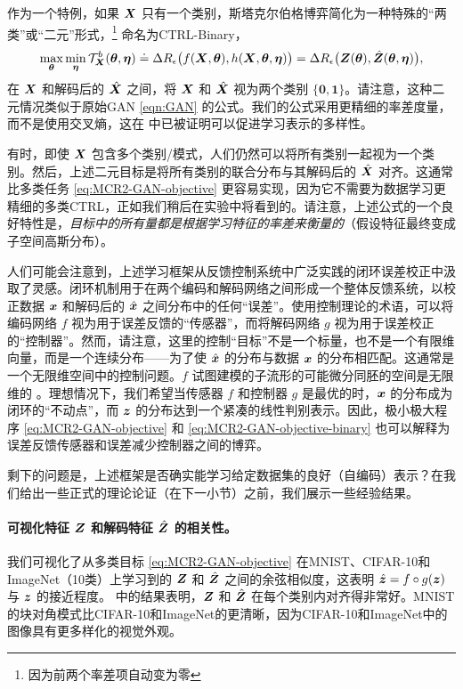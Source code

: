 \documentclass[../../book-main.tex]{subfiles}
\begin{document}
作为一个特例，如果 $\bm{X}$ 只有一个类别，斯塔克尔伯格博弈简化为一种特殊的“两类”或“二元”形式，\footnote{因为前两个率差项自动变为零} 命名为CTRL-Binary，
\begin{equation}
 \max_{\bm \theta} \min_{\bm \eta} \mathcal{T}^b_{\bm{X}}(\bm \theta, \bm \eta) \doteq \Delta R_\epsilon\big(f(\bm{X},\bm \theta), h(\bm{X},\bm \theta,\bm \eta)\big) = \Delta R_\epsilon\big(\bm{Z}(\bm \theta), \hat {\bm{Z}}(\bm \theta, \bm \eta)\big), 
    \label{eq:MCR2-GAN-objective-binary}
\end{equation}
在 $\bm{X}$ 和解码后的 $\hat{\bm{X}}$ 之间，将 $\bm{X}$ 和 $\hat {\bm{X}}$ 视为两个类别 $\{\bm 0, \bm 1\}$。请注意，这种二元情况类似于原始GAN \eqref{eqn:GAN} 的公式。我们的公式采用更精细的率差度量，而不是使用交叉熵，这在  中已被证明可以促进学习表示的多样性。

有时，即使 $\bm{X}$ 包含多个类别/模式，人们仍然可以将所有类别一起视为一个类别。然后，上述二元目标是将所有类别的联合分布与其解码后的 $\hat {\bm{X}}$ 对齐。这通常比多类任务 \eqref{eq:MCR2-GAN-objective} 更容易实现，因为它不需要为数据学习更精细的多类CTRL，正如我们稍后在实验中将看到的。请注意，上述公式的一个良好特性是，{\em 目标中的所有量都是根据学习特征的率差来衡量的}（假设特征最终变成子空间高斯分布）。

人们可能会注意到，上述学习框架从反馈控制系统中广泛实践的闭环误差校正中汲取了灵感。闭环机制用于在两个编码和解码网络之间形成一个整体反馈系统，以校正数据 $\bm{x}$ 和解码后的 $\hat {\bm{x}}$ 之间分布中的任何“误差”。使用控制理论的术语，可以将编码网络 $f$ 视为用于误差反馈的“传感器”，而将解码网络 $g$ 视为用于误差校正的“控制器”。然而，请注意，这里的控制“目标”不是一个标量，也不是一个有限维向量，而是一个连续分布——为了使 $\hat {\bm{x}}$ 的分布与数据 $\bm{x}$ 的分布相匹配。这通常是一个无限维空间中的控制问题。$f$ 试图建模的子流形的可能微分同胚的空间是无限维的 \cite{Lee2002IntroductionTS}。理想情况下，我们希望当传感器 $f$ 和控制器 $g$ 是最优的时，$\bm{x}$ 的分布成为闭环的“不动点”，而 $\bm{z}$ 的分布达到一个紧凑的线性判别表示。因此，极小极大程序 \eqref{eq:MCR2-GAN-objective} 和 \eqref{eq:MCR2-GAN-objective-binary} 也可以解释为误差反馈传感器和误差减少控制器之间的博弈。

剩下的问题是，上述框架是否确实能学习给定数据集的良好（自编码）表示？在我们给出一些正式的理论论证（在下一小节）之前，我们展示一些经验结果。

\paragraph{可视化特征 $\bm{Z}$ 和解码特征 $\hat {\bm{Z}}$ 的相关性。} 我们可视化了从多类目标 \eqref{eq:MCR2-GAN-objective} 在MNIST、CIFAR-10和ImageNet（10类）上学习到的 $\bm{Z}$ 和 $\hat{\bm{Z}}$ 之间的余弦相似度，这表明 $\hat{\bm{z}} = f\circ g(\bm{z})$ 与 $\bm{z}$ 的接近程度。  中的结果表明，$\bm{Z}$ 和 $\hat{\bm{Z}}$ 在每个类别内对齐得非常好。MNIST的块对角模式比CIFAR-10和ImageNet的更清晰，因为CIFAR-10和ImageNet中的图像具有更多样化的视觉外观。
\end{document}
